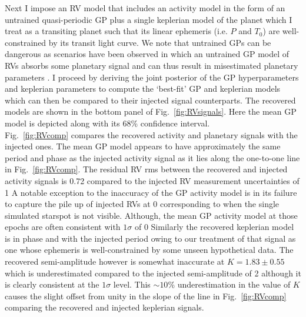 Next I impose an RV model that includes an activity model in the form of an untrained
quasi-periodic GP plus a single keplerian model of the planet which I treat as a transiting
planet such that its linear ephemeris (i.e. $P$ and $T_0$) are well-constrained by its transit
light curve. We note that untrained GPs can be dangerous as scenarios have been observed in which
an untrained GP model of RVs absorbs some planetary signal and can thus result in misestimated
planetary parameters \citep{ribas18}.
I proceed by deriving the joint posterior of the GP hyperparameters and keplerian
parameters to compute the `best-fit' GP and keplerian models which can then be compared to their
injected signal counterparts. The recovered models are shown in the bottom panel of
Fig.~\ref{fig:RVsignals}. Here the mean GP model is depicted along with its 68\% confidence
interval. \\

Fig.~\ref{fig:RVcomp} compares the recovered activity and planetary signals with the injected
ones. The mean GP model appears to have approximately the same period and phase as the injected activity
signal as it lies along the one-to-one line in Fig.~\ref{fig:RVcomp}. The residual RV rms between the
recovered and injected activity signals is 0.72 \mps{} compared to the injected RV measurement uncertainties
of 1  A notable exception to the inaccuracy of the GP activity model is in its failure to
capture the pile up of injected RVs at 0 \mps{} corresponding to when the single simulated starspot is
not visible. Although, the mean GP activity model at those epochs are often consistent with $1\sigma$ of
0  Similarly the recovered keplerian model is in phase and with the injected period owing to our
treatment of that signal as one whose ephemeris is well-constrained by some unseen hypothetical data.
The recovered semi-amplitude however is somewhat inaccurate at $K=1.83 \pm 0.55$ \mps{} which is underestimated
compared to the injected semi-amplitude of 2 \mps{} although it is clearly consistent at the $1\sigma$ level.
This $\sim 10$\% underestimation in the value of $K$ causes the slight offset from unity in the slope
of the line in Fig.~\ref{fig:RVcomp} comparing the recovered and injected keplerian signals.


